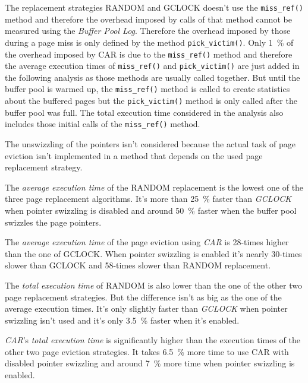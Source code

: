     The replacement strategies RANDOM and GCLOCK doesn't use the \lstinline{miss_ref()} method and therefore the overhead imposed by calls of that method cannot be measured using the \textit{Buffer Pool Log}. Therefore the overhead imposed by those during a page miss is only defined by the method \lstinline{pick_victim()}. Only \SI{1}{\percent} of the overhead imposed by CAR is due to the \lstinline{miss_ref()} method and therefore the average execution times of \lstinline{miss_ref()} and \lstinline{pick_victim()} are just added in the following analysis as those methods are usually called together. But until the buffer pool is warmed up, the \lstinline{miss_ref()} method is called to create statistics about the buffered pages but the \lstinline{pick_victim()} method is only called after the buffer pool was full. The total execution time considered in the analysis also includes those initial calls of the \lstinline{miss_ref()} method.

    The unswizzling of the pointers isn't considered because the actual task of page eviction isn't implemented in a method that depends on the used page replacement strategy.

    The \emph{average execution time} of the RANDOM replacement is the lowest one of the three page replacement algorithms. It's more than \SI{25}{\percent} faster than \emph{GCLOCK} when pointer swizzling is disabled and around \SI{50}{\percent} faster when the buffer pool swizzles the page pointers.

    The \emph{average execution time} of the page eviction using \emph{CAR} is 28-times higher than the one of GCLOCK. When pointer swizzling is enabled it's nearly 30-times slower than GCLOCK and 58-times slower than RANDOM replacement.

    The \emph{total execution time} of RANDOM is also lower than the one of the other two page replacement strategies. But the difference isn't as big as the one of the average execution times. It's only slightly faster than \emph{GCLOCK} when pointer swizzling isn't used and it's only \SI{3.5}{\percent} faster when it's enabled.

    \emph{CAR}'s \emph{total execution time} is significantly higher than the execution times of the other two page eviction strategies. It takes \SI{6.5}{\percent} more time to use CAR with disabled pointer swizzling and around \SI{7}{\percent} more time when pointer swizzling is enabled.

